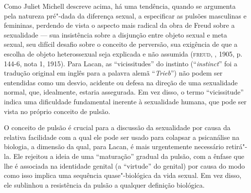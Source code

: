 Como Juliet Michell descreve acima, há uma tendência, quando se
argumenta pela natureza pré"-dada da diferença sexual, a especificar as
pulsões masculinas e femininas, perdendo de vista o aspecto mais radical
da obra de Freud sobre a sexualidade --- sua insistência sobre a
disjunção entre objeto sexual e meta sexual, seu difícil desafio sobre o
conceito de perversão, sua exigência de que a escolha de objeto
heterossexual seja explicada e não assumida (\textsc{freud}, , 1905, p.
144-6, nota 1, 1915). Para Lacan, as ``vicissitudes'' do instinto
(``\emph{instinct}'' foi a tradução original em inglês para a palavra
alemã ``\emph{Trieb}'') não podem ser entendidas como um desvio,
acidente ou defesa na direção de uma sexualidade normal, que,
idealmente, estaria assegurada. Em vez disso, o termo ``vicissitude''
indica uma dificuldade fundamental inerente à sexualidade humana, que
pode ser vista no próprio conceito de pulsão.

O conceito de pulsão é crucial para a discussão da sexualidade por causa
da relativa facilidade com a qual ele pode ser usado para colapsar a
psicanálise na biologia, a dimensão da qual, para Lacan, é mais
urgentemente necessário retirá"-la. Ele rejeitou a ideia de uma
``maturação'' gradual da pulsão, com a ênfase que lhe é associada na
identidade genital (a ``virtude'' do genital) por causa do modo como
isso implica uma sequência quase"-biológica da vida sexual. Em vez disso,
ele sublinhou a resistência da pulsão a qualquer definição biológica.

